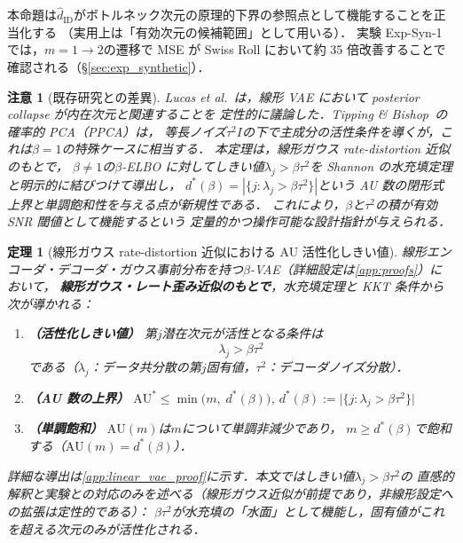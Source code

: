 \documentclass[11pt,a4paper]{jsarticle}
\newtheorem{theorem}{定理}
\newtheorem{remark}{注意}
\begin{document}
本命題は$\hat{d}_\mathrm{ID}$がボトルネック次元の原理的下界の参照点として機能することを正当化する
（実用上は「有効次元の候補範囲」として用いる）．
実験 Exp-Syn-1 では，$m = 1 \to 2$の遷移で MSE が Swiss Roll において約 35 倍改善することで確認される（§\ref{sec:exp_synthetic}）．

\begin{remark}[既存研究との差異]
Lucas et al.~\cite{lucas2019elbo}は，線形 VAE において posterior collapse が内在次元と関連することを
定性的に議論した．Tipping \& Bishop~\cite{tippingbishop1999ppca}の確率的 PCA（PPCA）は，
等長ノイズ$\tau^2 I$の下で主成分の活性条件を導くが，これは$\beta = 1$の特殊ケースに相当する．
本定理は，線形ガウス rate-distortion 近似のもとで，
$\beta \neq 1$の$\beta$-ELBO に対してしきい値$\lambda_j > \beta\tau^2$を
Shannon の水充填定理\cite{cover2006elements}と明示的に結びつけて導出し，
$d^*(\beta) = |\{j:\lambda_j > \beta\tau^2\}|$という AU 数の閉形式上界と単調飽和性を与える点が新規性である．
これにより，$\beta$と$\tau^2$の積が有効 SNR 閾値として機能するという
定量的かつ操作可能な設計指針が与えられる．
\end{remark}

\begin{theorem}[線形ガウス rate-distortion 近似における AU 活性化しきい値]\label{thm:linear_vae}
線形エンコーダ・デコーダ・ガウス事前分布を持つ$\beta$-VAE（詳細設定は\ref{app:proofs}）において，
\textbf{線形ガウス・レート歪み近似のもとで}，水充填定理と KKT 条件から次が導かれる：

\begin{enumerate}
  \item \textbf{（活性化しきい値）} 第$j$潜在次元が活性となる条件は
        \begin{equation}
          \lambda_j > \beta \tau^2 \label{eq:au_threshold}
        \end{equation}
        である（$\lambda_j$：データ共分散の第$j$固有値，$\tau^2$：デコーダノイズ分散）．
  \item \textbf{（AU 数の上界）}
        $\mathrm{AU}^* \leq \min\bigl(m,\; d^*(\beta)\bigr)$,\quad
        $d^*(\beta) := \bigl|\{j : \lambda_j > \beta\tau^2\}\bigr|$
  \item \textbf{（単調飽和）}
        $\mathrm{AU}(m)$は$m$について単調非減少であり，
        $m \geq d^*(\beta)$で飽和する（$\mathrm{AU}(m) = d^*(\beta)$）．
\end{enumerate}

\noindent
詳細な導出は\ref{app:linear_vae_proof}に示す．本文ではしきい値$\lambda_j > \beta\tau^2$の
直感的解釈と実験との対応のみを述べる（線形ガウス近似が前提であり，非線形設定への拡張は定性的である）：
$\beta\tau^2$が水充填の「水面」として機能し，固有値がこれを超える次元のみが活性化される．
\end{theorem}
\end{document}
